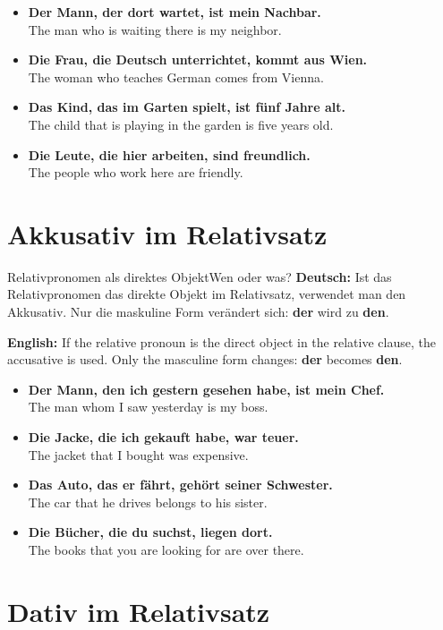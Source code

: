 \documentclass[a4paper,11pt]{article}
\newcommand{\GermanText}[1]{\textbf{Deutsch: }#1\par}
\newcommand{\EnglishText}[1]{{\small\color{SoftGray}\textbf{English: }#1\par}}
\newcommand{\ExampleItem}[2]{\item \textbf{#1}\\{\small\color{SoftGray}#2}}
\begin{document}
        \begin{exbox}
            \begin{itemize}
                \ExampleItem{Der Mann, der dort wartet, ist mein Nachbar.}{The man who is waiting there is my neighbor.}
                \ExampleItem{Die Frau, die Deutsch unterrichtet, kommt aus Wien.}{The woman who teaches German comes from Vienna.}
                \ExampleItem{Das Kind, das im Garten spielt, ist fünf Jahre alt.}{The child that is playing in the garden is five years old.}
                \ExampleItem{Die Leute, die hier arbeiten, sind freundlich.}{The people who work here are friendly.}
            \end{itemize}
        \end{exbox}

    \section{Akkusativ im Relativsatz}

        \begin{grammarentry}{Relativpronomen als direktes Objekt}{Wen oder was?}
            \GermanText{Ist das Relativpronomen das direkte Objekt im Relativsatz, verwendet man den Akkusativ. Nur die maskuline Form verändert sich: \textbf{der} wird zu \textbf{den}.}
            \EnglishText{If the relative pronoun is the direct object in the relative clause, the accusative is used. Only the masculine form changes: \textbf{der} becomes \textbf{den}.}
        \end{grammarentry}

        \begin{exbox}
            \begin{itemize}
                \ExampleItem{Der Mann, den ich gestern gesehen habe, ist mein Chef.}{The man whom I saw yesterday is my boss.}
                \ExampleItem{Die Jacke, die ich gekauft habe, war teuer.}{The jacket that I bought was expensive.}
                \ExampleItem{Das Auto, das er fährt, gehört seiner Schwester.}{The car that he drives belongs to his sister.}
                \ExampleItem{Die Bücher, die du suchst, liegen dort.}{The books that you are looking for are over there.}
            \end{itemize}
        \end{exbox}

    \section{Dativ im Relativsatz}
\end{document}
